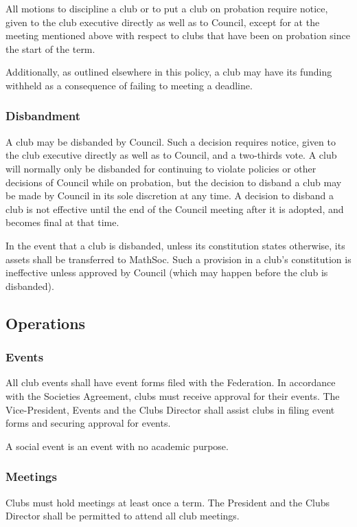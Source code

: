 All motions to discipline a club or to put a club on probation require notice,
given to the club executive directly as well as to Council, except for at the
meeting mentioned above with respect to clubs that have been on probation since
the start of the term.

Additionally, as outlined elsewhere in this policy, a club may have its funding
withheld as a consequence of failing to meeting a deadline.

\subsubsection{Disbandment}
A club may be disbanded by Council. Such a decision requires notice, given to
the club executive directly as well as to Council, and a two-thirds vote. A club
will normally only be disbanded for continuing to violate policies or other
decisions of Council while on probation, but the decision to disband a club may
be made by Council in its sole discretion at any time. A decision to disband a
club is not effective until the end of the Council meeting after it is adopted,
and becomes final at that time.

In the event that a club is disbanded, unless its constitution states otherwise,
its assets shall be transferred to MathSoc. Such a provision in a club's
constitution is ineffective unless approved by Council (which may happen before
the club is disbanded).

\subsection{Operations}
\subsubsection{Events}
All club events shall have event forms filed with the Federation. In accordance
with the Societies Agreement, clubs must receive approval for their events.  The
Vice-President, Events and the Clubs Director shall assist clubs in filing
event forms and securing approval for events.

A social event is an event with no academic purpose.

\subsubsection{Meetings}
Clubs must hold meetings at least once a term. The President and the Clubs
Director shall be permitted to attend all club meetings.

